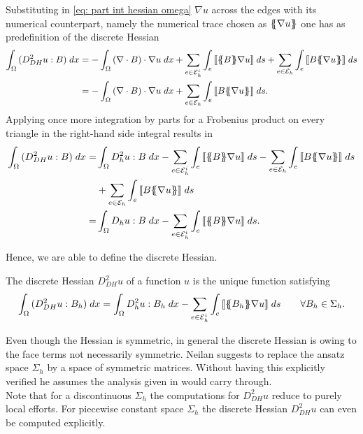 Substituting in \eqref{eq: part int hessian omega} $\nabla u$ across the edges with its numerical counterpart, namely the numerical trace chosen as $\{\!\!\{ \nabla u \}\!\!\}$ one has as predefinition of the discrete Hessian
	\begin{align}
		\myIntX  \Omega { (D_{DH}^2 u : B) }
		&= - \myIntX  \Omega { \left(\nabla \cdot B\right) \cdot \nabla u}
		+ \sum_{ e \in \edgesi} \myIntS e {  \jump {\average B \nabla u } }
				+ \sum_{ e \in \edges} \myIntS e { \jump {B \average {\nabla u} }}  \nonumber \\
		&= - \myIntX  \Omega { \left(\nabla \cdot B\right) \cdot \nabla u}
				+ \sum_{ e \in \edges} \myIntS e {  \jump{B \average {\nabla u} }}.	
	\end{align}
Applying once more integration by parts for a Frobenius product on every triangle in the right-hand side integral results in
	\begin{align}
		\myIntX  \Omega { (D_{DH}^2 u : B) }
		=& \myIntX  \Omega { D^2_h u: B }
			-\sum_{ e \in \edgesi} \myIntS e {  \jump {\average B  \nabla u }}
			- \sum_{ e \in \edges} \myIntS e { \jump {B \average {\nabla u} }}\nonumber \\		
			&+ \sum_{ e \in \edges} \myIntS e {  \jump {B \average {\nabla u} }}		\nonumber \\
		=& \myIntX  \Omega { D_h u: B}
			 -\sum_{ e \in \edgesi} \myIntS e {  \jump {\average B  \nabla u }	}.
	\end{align}

Hence, we are able to define the discrete Hessian.
\begin{definition} \label{def: discrete Hessian}
	The discrete Hessian $D_{DH}^2 u$ of a function $u$ is the unique function satisfying
	\begin{align}
		\int_{\Omega} {{ (D_{DH}^2 u : B_h) }\;dx}
		= \int_{\Omega} {{ D^2_h u: B_h}\;dx}
			 -\sum_{ e \in \mathcal{E}_h^i} \int_{e} {{  \llbracket \{\!\!\{ B_h \}\!\!\} \nabla u  \rrbracket}\;ds}\qquad \forall B_h \in \Sigma_h. \label{eq: discrete hessian}
	\end{align}
\end{definition}

Even though the Hessian is symmetric, in general the discrete Hessian is owing to the face terms not necessarily symmetric. Neilan suggests to replace the ansatz space $\Sigma_h$ by a space of symmetric matrices. Without having this explicitly verified he assumes the analysis given in \cite{Neilan2014} would carry through.\\
Note that for a discontinuous $\Sigma_h$ the computations for $D_{DH}^2 u$ reduce to purely local efforts. For piecewise constant space $\Sigma_h$ the discrete Hessian $D_{DH}^2 u$ can even be computed explicitly.

